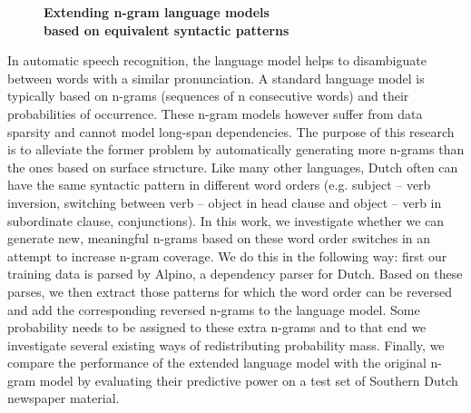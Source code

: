 \documentclass[10pt, a4paper, twopage, headinclude, footinclude, BCOR5mm]{book}
\begin{document}
\newpage

\begin{figure}[t!]
\centering
\large\textbf{Extending n-gram language models \\ based on equivalent syntactic patterns}
\vspace*{0.5cm}
\end{figure}


\begin{table}[t!]
\end{table} 
\noindent
In automatic speech recognition, the language model helps to disambiguate between words with a similar pronunciation. A standard language model is typically based on n-grams (sequences of n consecutive words) and their probabilities of occurrence. These n-gram models however suffer from data sparsity and cannot model long-span dependencies. The purpose of this research is to alleviate the former problem by automatically generating more n-grams than the ones based on surface structure.  Like many other languages, Dutch often can have the same syntactic pattern in different word orders (e.g. subject – verb inversion, switching between verb – object in head clause and object – verb in subordinate clause, conjunctions). In this work, we investigate whether we can generate new, meaningful n-grams based on these word order switches in an attempt to increase n-gram coverage. We do this in the following way: first our training data is parsed by Alpino, a dependency parser for Dutch. Based on these parses, we then extract those patterns for which the word order can be reversed and add the corresponding reversed n-grams to the language model. Some probability needs to be assigned to these extra n-grams and to that end we investigate several existing ways of redistributing probability mass. Finally, we compare the performance of the extended language model with the original n-gram model by evaluating their predictive power on a test set of Southern Dutch newspaper material.  
\end{document}
